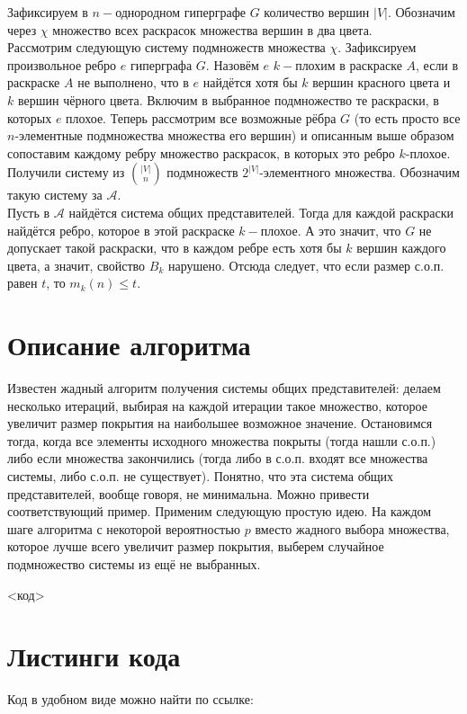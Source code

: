 \documentclass{article}
\begin{document}
        Зафиксируем в $n-$однородном гиперграфе $G$ количество вершин $|V|$. Обозначим через $\chi$ множество всех раскрасок множества вершин в два цвета.\\
        Рассмотрим следующую систему подмножеств множества $\chi$. Зафиксируем произвольное ребро $e$ гиперграфа $G$. Назовём $e$ $k-$плохим в раскраске $A$, если в раскраске $A$ не выполнено, что в $e$ найдётся хотя бы $k$ вершин красного цвета и $k$ вершин чёрного цвета. Включим в выбранное подмножество те раскраски, в которых $e$ плохое. Теперь рассмотрим все возможные рёбра $G$ (то есть просто все $n$-элементные подмножества множества его вершин) и описанным выше образом сопоставим каждому ребру множество раскрасок, в которых это ребро $k$-плохое. Получили систему из ${|V| \choose n}$ подмножеств $2^{|V|}$-элементного множества. Обозначим такую систему за $\mathcal{A}$.\\
        Пусть в $\mathcal{A}$ найдётся система общих представителей. Тогда для каждой раскраски найдётся ребро, которое в этой раскраске $k-$плохое. А это значит, что $G$ не допускает такой раскраски, что в каждом ребре есть хотя бы $k$ вершин каждого цвета, а значит, свойство $B_k$ нарушено. Отсюда следует, что если размер с.о.п. равен $t$, то $m_k(n) \leq t$.
			
    \section{Описание алгоритма}
    Известен жадный алгоритм получения системы общих представителей: делаем несколько итераций, выбирая на каждой итерации такое множество, которое увеличит размер покрытия на наибольшее возможное значение. Остановимся тогда, когда все элементы исходного множества покрыты (тогда нашли с.о.п.) либо если множества закончились (тогда либо в с.о.п. входят все множества системы, либо с.о.п. не существует). Понятно, что эта система общих представителей, вообще говоря, не минимальна. Можно привести соответствующий пример. 
    Применим следующую простую идею. На каждом шаге алгоритма с некоторой вероятностью $p$ вместо жадного выбора множества, которое лучше всего увеличит размер покрытия, выберем случайное подмножество системы из ещё не выбранных.

    <код>

    \section{Листинги кода}

    Код в удобном виде можно найти по ссылке:
\end{document}
